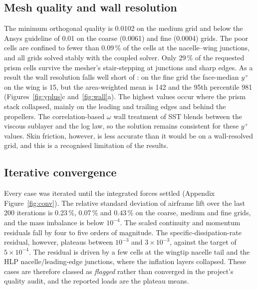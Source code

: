 \documentclass[10pt,a4paper]{article}
\begin{document}
\subsection{Mesh quality and wall resolution}
The minimum orthogonal quality is 0.0102 on the medium grid and below the Ansys guideline of 0.01 on the coarse
(0.0061) and fine (0.0004) grids. The poor cells are confined to fewer than 0.09\,\% of the cells at the
nacelle--wing junctions, and all grids solved stably with the coupled solver. Only 29\,\% of the requested prism
cells survive the mesher's stair-stepping at junctions and sharp edges. As a result the wall resolution falls well
short of : on the fine grid the face-median $y^+$ on the wing is 15, but the
area-weighted mean is 142 and the 95th percentile 981 (Figures~\ref{fig:yplus}c and~\ref{fig:wall}a). The highest
values occur where the prism stack collapsed, mainly on the leading and trailing edges and behind the propellers.
The correlation-based $\omega$ wall treatment of SST blends between the viscous sublayer and the log law, so the
solution remains consistent for these $y^+$ values. Skin friction, however, is less accurate than it would be on a
wall-resolved grid, and this is a recognised limitation of the results.

\subsection{Iterative convergence}
Every case was iterated until the integrated forces settled (Appendix Figure~\ref{fig:conv}). The relative standard
deviation of airframe lift over the last 200 iterations is 0.23\,\%, 0.07\,\% and 0.43\,\% on the coarse, medium
and fine grids, and the mass imbalance is below $10^{-4}$. The scaled continuity and momentum residuals fall by four
to five orders of magnitude. The specific-dissipation-rate residual, however, plateaus between $10^{-3}$ and
$3\times10^{-3}$, against the target of $5\times10^{-4}$. The residual is driven by a few cells at the wingtip
nacelle tail and the HLP nacelle/leading-edge junctions, where the inflation layers collapsed. These cases are
therefore classed as \emph{flagged} rather than converged in the project's quality audit, and the reported loads are
the plateau means.
\end{document}
